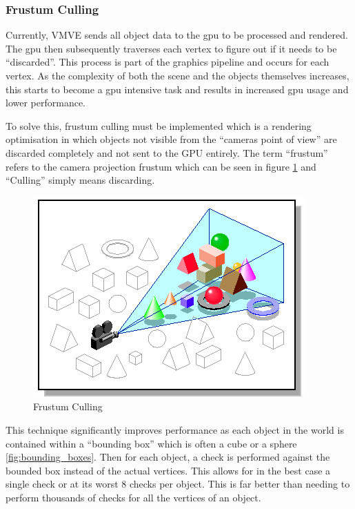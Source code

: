 \documentclass[11pt]{article}
\begin{document}
\subsubsection{Frustum Culling}
Currently, VMVE sends all object data to the \gls*{gpu} to be processed and
rendered. The \gls*{gpu} then subsequently traverses each vertex to figure out if
it needs to be ``discarded''. This process is part of the graphics pipeline and
occurs for each vertex. As the complexity of both the scene and the objects
themselves increases, this starts to become a \gls*{gpu} intensive task and
results in increased \gls*{gpu} usage and lower performance.

To solve this, frustum culling must be implemented which is a rendering
optimisation in which objects not visible from the ``cameras point of view'' are
discarded completely and not sent to the GPU entirely. The term ``frustum'' refers
to the camera projection frustum which can be seen in figure
\ref{fig:frustum_culling} and ``Culling'' simply means discarding.

\begin{figure}[H]
  \centering
  \includegraphics[width=\textwidth]{images/frustum_culling.png}
  \caption{Frustum Culling \cite{frustum_culling}}
  \label{fig:frustum_culling}
\end{figure}


This technique significantly improves performance as each object in the world is
contained within a ``bounding box'' which is often a cube or a sphere
\ref{fig:bounding_boxes}. Then for each object, a check is performed against the
bounded box instead of the actual vertices. This allows for in the best case a
single check or at its worst 8 checks per object. This is far better than
needing to perform thousands of checks for all the vertices of an object.
\end{document}
